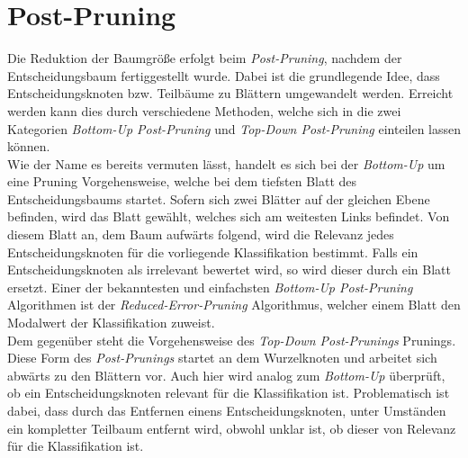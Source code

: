 \section{Post-Pruning}
\label{post-pruning}
Die Reduktion der Baumgröße erfolgt beim \textit{Post-Pruning}, nachdem der Entscheidungsbaum fertiggestellt wurde. Dabei ist die grundlegende Idee, dass Entscheidungsknoten bzw. Teilbäume zu Blättern umgewandelt werden. Erreicht werden kann dies durch verschiedene Methoden, welche sich in die zwei Kategorien \textit{Bottom-Up Post-Pruning} und \textit{Top-Down Post-Pruning} einteilen lassen können. \autocite{WikiPruning:online}\\
Wie der Name es bereits vermuten lässt, handelt es sich bei der \textit{Bottom-Up} um eine Pruning Vorgehensweise, welche bei dem tiefsten Blatt des Entscheidungsbaums startet. Sofern sich zwei Blätter auf der gleichen Ebene befinden, wird das Blatt gewählt, welches sich am weitesten Links befindet. \autocite{SebastianManteyPruning:online} Von diesem Blatt an, dem Baum aufwärts folgend, wird die Relevanz jedes Entscheidungsknoten für die vorliegende Klassifikation bestimmt. Falls ein Entscheidungsknoten als irrelevant bewertet wird, so wird dieser durch ein Blatt ersetzt. Einer der bekanntesten und einfachsten \textit{Bottom-Up Post-Pruning} Algorithmen ist der \textit{Reduced-Error-Pruning} Algorithmus, welcher einem Blatt den Modalwert der Klassifikation zuweist. \autocite{SebastianManteyPruning:online}\\
Dem gegenüber steht die Vorgehensweise des \textit{Top-Down Post-Prunings} Prunings. Diese Form des \textit{Post-Prunings} startet an dem Wurzelknoten und arbeitet sich abwärts zu den Blättern vor. Auch hier wird analog zum \textit{Bottom-Up} überprüft, ob ein Entscheidungsknoten relevant für die Klassifikation ist. Problematisch ist dabei, dass durch das Entfernen einens Entscheidungsknoten, unter Umständen ein kompletter Teilbaum entfernt wird, obwohl unklar ist, ob dieser von Relevanz für die Klassifikation ist. \autocites{WikiPruning:online}{SebastianManteyPruning:online}